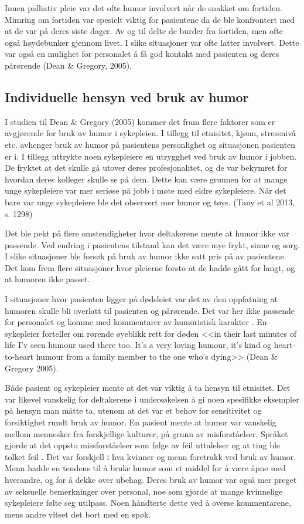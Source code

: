 Innen palliativ pleie var det ofte humor involvert når de snakket om fortiden.
Mimring om fortiden var spesielt viktig for pasientene da de ble konfrontert
med at de var på deres siste dager. Av og til delte de burder fra fortiden, men
ofte også høydebunker gjennom livet. I slike situasjoner var ofte latter
involvert. Dette var også en mulighet for personalet å få god kontakt med
pasienten og deres pårørende (Dean \&{} Gregory, 2005).

\subsection{Individuelle hensyn ved bruk av humor}

I studien til Dean \&{} Gregory (2005) kommer det fram flere faktorer som er
avgjørende for bruk av humor i sykepleien. I tillegg til etnisitet, kjønn,
stressnivå etc. avhenger bruk av humor på pasientens personlighet og
situasjonen pasienten er i. I tillegg uttrykte noen sykepleiere en utrygghet
ved bruk av humor i jobben. De fryktet at det skulle gå utover deres
profesjonalitet, og de var bekymret for hvordan deres kolleger skulle se på
dem. Dette kan være grunnen for at mange unge sykepleiere var mer seriøse på
jobb i møte med eldre sykepleiere. Når det bare var unge sykepleiere ble det
observert mer humor og tøys. (Tany et al 2013, s. 1298)

Det ble pekt på flere omstendigheter hvor deltakerene mente at humor ikke var
passende. Ved endring i pasientens tilstand kan det være mye frykt, sinne og
sorg. I slike situasjoner ble forsøk på bruk av humor ikke satt pris på av
pasientene. Det kom frem flere situasjoner hvor pleierne forsto at de hadde
gått for langt, og at humoren ikke passet.

I situasjoner hvor pasienten ligger på dødsleiet var det av den oppfatning at
humoren skulle bli overlatt til pasienten og pårørende. Det var her ikke
passende for personalet og komme med kommentarer av humoristisk karakter .  En
sykepleier forteller om rørende øyeblikk rett før døden <<in their last minutes
of life I’v seen humour used there too. It’s a very loving humour, it’s kind og
heart-to-heart humour from a family member to the one who’s dying>> (Dean \&{}
Gregory 2005).

Både pasient og sykepleier mente at det var viktig å ta hensyn til etnisitet.
Det var likevel vanskelig for deltakerene i undersøkelsen å gi noen spesifikke
eksempler på hensyn man måtte ta, utenom at det var et behov for sensitivitet
og forsiktighet rundt bruk av humor. En pasient mente at humor var vanskelig
mellom mennesker fra forskjellige kulturer, på grunn av misforståelser. Språket
gjorde at det oppsto missforståelser som følge av feil uttalelser og at ting
ble tolket feil .  Det var forskjell i hva kvinner og menn foretrakk ved bruk
av humor. Menn hadde en tendens til å bruke humor som et middel for å være åpne
med hverandre, og for å dekke over ubehag. Deres bruk av humor var også mer
preget av seksuelle bemerkninger over personal, noe som gjorde at mange
kvinnelige sykepleiere følte seg utilpass. Noen håndterte dette ved å overse
kommentarene, mens andre vitset det bort med en spøk.

